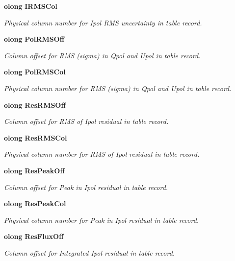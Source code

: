 \begin{CompactItemize}
{\bf olong} {\bf IRMSCol}
\begin{CompactList}\small\item\em Physical column number for Ipol RMS uncertainty in table record. \item\end{CompactList}\item 
{\bf olong} {\bf Pol\-RMSOff}
\begin{CompactList}\small\item\em Column offset for RMS (sigma) in Qpol and Upol in table record. \item\end{CompactList}\item 
{\bf olong} {\bf Pol\-RMSCol}
\begin{CompactList}\small\item\em Physical column number for RMS (sigma) in Qpol and Upol in table record. \item\end{CompactList}\item 
{\bf olong} {\bf Res\-RMSOff}
\begin{CompactList}\small\item\em Column offset for RMS of Ipol residual in table record. \item\end{CompactList}\item 
{\bf olong} {\bf Res\-RMSCol}
\begin{CompactList}\small\item\em Physical column number for RMS of Ipol residual in table record. \item\end{CompactList}\item 
{\bf olong} {\bf Res\-Peak\-Off}
\begin{CompactList}\small\item\em Column offset for Peak in Ipol residual in table record. \item\end{CompactList}\item 
{\bf olong} {\bf Res\-Peak\-Col}
\begin{CompactList}\small\item\em Physical column number for Peak in Ipol residual in table record. \item\end{CompactList}\item 
{\bf olong} {\bf Res\-Flux\-Off}
\begin{CompactList}\small\item\em Column offset for Integrated Ipol residual in table record. \item\end{CompactList}\item 

\end{CompactItemize}
